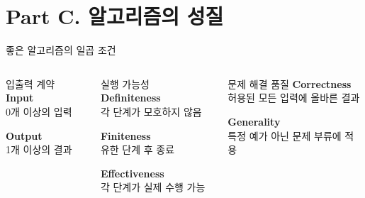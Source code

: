\section{Part C. 알고리즘의 성질}

\begin{frame}{좋은 알고리즘의 일곱 조건}
  \begin{columns}[T,onlytextwidth]
      \begin{block}{입출력 계약}
        \textbf{Input}\\[-1mm]
        0개 이상의 입력\par\medskip
        \textbf{Output}\\[-1mm]
        1개 이상의 결과
      \end{block}
      \begin{block}{실행 가능성}
        \textbf{Definiteness}\\[-1mm]
        각 단계가 모호하지 않음\par\smallskip
        \textbf{Finiteness}\\[-1mm]
        유한 단계 후 종료\par\smallskip
        \textbf{Effectiveness}\\[-1mm]
        각 단계가 실제 수행 가능
      \end{block}
      \begin{block}{문제 해결 품질}
        \textbf{Correctness}\\[-1mm]
        허용된 모든 입력에 올바른 결과\par\medskip
        \textbf{Generality}\\[-1mm]
        특정 예가 아닌 문제 부류에 적용
      \end{block}
  \end{columns}
  \vfill
\end{frame}

